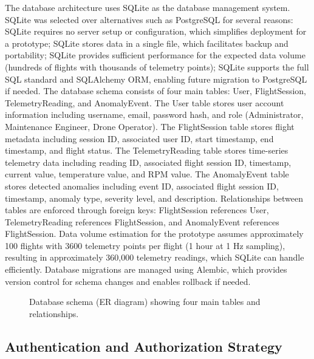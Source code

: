 The database architecture uses SQLite as the database management system. SQLite was selected over alternatives such as PostgreSQL for several reasons: SQLite requires no server setup or configuration, which simplifies deployment for a prototype; SQLite stores data in a single file, which facilitates backup and portability; SQLite provides sufficient performance for the expected data volume (hundreds of flights with thousands of telemetry points); SQLite supports the full SQL standard and SQLAlchemy ORM, enabling future migration to PostgreSQL if needed. The database schema consists of four main tables: User, FlightSession, TelemetryReading, and AnomalyEvent. The User table stores user account information including username, email, password hash, and role (Administrator, Maintenance Engineer, Drone Operator). The FlightSession table stores flight metadata including session ID, associated user ID, start timestamp, end timestamp, and flight status. The TelemetryReading table stores time-series telemetry data including reading ID, associated flight session ID, timestamp, current value, temperature value, and RPM value. The AnomalyEvent table stores detected anomalies including event ID, associated flight session ID, timestamp, anomaly type, severity level, and description. Relationships between tables are enforced through foreign keys: FlightSession references User, TelemetryReading references FlightSession, and AnomalyEvent references FlightSession. Data volume estimation for the prototype assumes approximately 100 flights with 3600 telemetry points per flight (1 hour at 1 Hz sampling), resulting in approximately 360,000 telemetry readings, which SQLite can handle efficiently. Database migrations are managed using Alembic, which provides version control for schema changes and enables rollback if needed.

\begin{figure}[H]
\centering
\caption{Database schema (ER diagram) showing four main tables and relationships.}
\label{fig:database_schema}
\end{figure}

\subsection{Authentication and Authorization Strategy}

